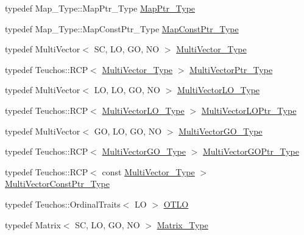 \begin{DoxyCompactItemize}
typedef Map\+\_\+\+Type\+::\+Map\+Ptr\+\_\+\+Type \hyperlink{classFEDD_1_1AdaptiveMeshRefinement_a751bcbe2e4fddcdcde836067b776d42d}{Map\+Ptr\+\_\+\+Type}
\item 
typedef Map\+\_\+\+Type\+::\+Map\+Const\+Ptr\+\_\+\+Type \hyperlink{classFEDD_1_1AdaptiveMeshRefinement_a584bfb3398e9072ddf188bfa3c04c926}{Map\+Const\+Ptr\+\_\+\+Type}
\item 
typedef Multi\+Vector$<$ SC, LO, GO, NO $>$ \hyperlink{classFEDD_1_1AdaptiveMeshRefinement_afba165f2caa97c6de40654b1ee51e38d}{Multi\+Vector\+\_\+\+Type}
\item 
typedef Teuchos\+::\+R\+CP$<$ \hyperlink{classFEDD_1_1AdaptiveMeshRefinement_afba165f2caa97c6de40654b1ee51e38d}{Multi\+Vector\+\_\+\+Type} $>$ \hyperlink{classFEDD_1_1AdaptiveMeshRefinement_af4fb11adbdf1bba9bcaf8952324d32f2}{Multi\+Vector\+Ptr\+\_\+\+Type}
\item 
typedef Multi\+Vector$<$ LO, LO, GO, NO $>$ \hyperlink{classFEDD_1_1AdaptiveMeshRefinement_ae48fff0bc9a94bc0332516f1d1e05d92}{Multi\+Vector\+L\+O\+\_\+\+Type}
\item 
typedef Teuchos\+::\+R\+CP$<$ \hyperlink{classFEDD_1_1AdaptiveMeshRefinement_ae48fff0bc9a94bc0332516f1d1e05d92}{Multi\+Vector\+L\+O\+\_\+\+Type} $>$ \hyperlink{classFEDD_1_1AdaptiveMeshRefinement_a838fdef10af2d85bf1259037b821019e}{Multi\+Vector\+L\+O\+Ptr\+\_\+\+Type}
\item 
typedef Multi\+Vector$<$ GO, LO, GO, NO $>$ \hyperlink{classFEDD_1_1AdaptiveMeshRefinement_a582403f1b9f5ba542a6269e1b00a9031}{Multi\+Vector\+G\+O\+\_\+\+Type}
\item 
typedef Teuchos\+::\+R\+CP$<$ \hyperlink{classFEDD_1_1AdaptiveMeshRefinement_a582403f1b9f5ba542a6269e1b00a9031}{Multi\+Vector\+G\+O\+\_\+\+Type} $>$ \hyperlink{classFEDD_1_1AdaptiveMeshRefinement_ab2378e2061f0df4ec2df4a44af300996}{Multi\+Vector\+G\+O\+Ptr\+\_\+\+Type}
\item 
typedef Teuchos\+::\+R\+CP$<$ const \hyperlink{classFEDD_1_1AdaptiveMeshRefinement_afba165f2caa97c6de40654b1ee51e38d}{Multi\+Vector\+\_\+\+Type} $>$ \hyperlink{classFEDD_1_1AdaptiveMeshRefinement_ad8871639b0a35039184611ce286a446c}{Multi\+Vector\+Const\+Ptr\+\_\+\+Type}
\item 
typedef Teuchos\+::\+Ordinal\+Traits$<$ LO $>$ \hyperlink{classFEDD_1_1AdaptiveMeshRefinement_a5926fc86d008bfd69ae52e9190197eb0}{O\+T\+LO}
\item 
typedef Matrix$<$ SC, LO, GO, NO $>$ \hyperlink{classFEDD_1_1AdaptiveMeshRefinement_a607791df1d84bc4ea9fc08acd31225c7}{Matrix\+\_\+\+Type}

\end{DoxyCompactItemize}
